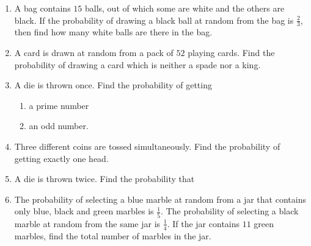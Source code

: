\begin{enumerate}
\item A bag contains $15$ balls, out of which some are white and the others are black. If the probability of drawing a black ball at random from the bag is $\frac{2}{3}$, then find how many white balls are there in the bag.

\item A card is drawn at random from a pack of $52$ playing cards. Find the probability of drawing a card which is neither a spade nor a king.

\item A die is thrown once. Find the probability of getting
\begin{enumerate}
    \item a prime number
    \item an odd number. 
\end{enumerate}

\item Three different coins are tossed simultaneously. Find the probability of getting exactly one head.

\item A die is thrown twice. Find the probability that
\begin{enumerate}
\end{enumerate}

\item The probability of selecting a blue marble at random from a jar that contains only blue, black and green marbles is $\frac{1}{5}$. The probability of selecting a black marble at random from the same jar is $\frac{1}{4}$. If the jar contains $11$ green marbles, find the total number of marbles in the jar.
\end{enumerate}

